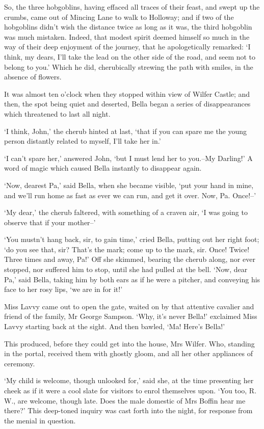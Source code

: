 So, the three hobgoblins, having effaced all traces of their feast, and
swept up the crumbs, came out of Mincing Lane to walk to Holloway; and
if two of the hobgoblins didn’t wish the distance twice as long as it
was, the third hobgoblin was much mistaken. Indeed, that modest spirit
deemed himself so much in the way of their deep enjoyment of the
journey, that he apologetically remarked: ‘I think, my dears, I’ll take
the lead on the other side of the road, and seem not to belong to you.’
Which he did, cherubically strewing the path with smiles, in the absence
of flowers.

It was almost ten o’clock when they stopped within view of Wilfer
Castle; and then, the spot being quiet and deserted, Bella began a
series of disappearances which threatened to last all night.

‘I think, John,’ the cherub hinted at last, ‘that if you can spare me
the young person distantly related to myself, I’ll take her in.’

‘I can’t spare her,’ answered John, ‘but I must lend her to you.--My
Darling!’ A word of magic which caused Bella instantly to disappear
again.

‘Now, dearest Pa,’ said Bella, when she became visible, ‘put your hand
in mine, and we’ll run home as fast as ever we can run, and get it over.
Now, Pa. Once!--’

‘My dear,’ the cherub faltered, with something of a craven air, ‘I was
going to observe that if your mother--’

‘You mustn’t hang back, sir, to gain time,’ cried Bella, putting out her
right foot; ‘do you see that, sir? That’s the mark; come up to the mark,
sir. Once! Twice! Three times and away, Pa!’ Off she skimmed, bearing
the cherub along, nor ever stopped, nor suffered him to stop, until she
had pulled at the bell. ‘Now, dear Pa,’ said Bella, taking him by both
ears as if he were a pitcher, and conveying his face to her rosy lips,
‘we are in for it!’

Miss Lavvy came out to open the gate, waited on by that attentive
cavalier and friend of the family, Mr George Sampson. ‘Why, it’s never
Bella!’ exclaimed Miss Lavvy starting back at the sight. And then
bawled, ‘Ma! Here’s Bella!’

This produced, before they could get into the house, Mrs Wilfer. Who,
standing in the portal, received them with ghostly gloom, and all her
other appliances of ceremony.

‘My child is welcome, though unlooked for,’ said she, at the time
presenting her cheek as if it were a cool slate for visitors to enrol
themselves upon. ‘You too, R. W., are welcome, though late. Does the
male domestic of Mrs Boffin hear me there?’ This deep-toned inquiry was
cast forth into the night, for response from the menial in question.

